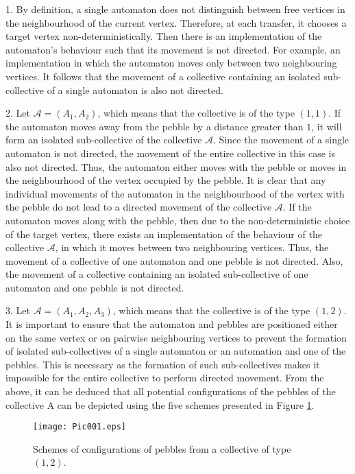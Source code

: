 \documentclass{article}
\newenvironment{proof}[1][Proof]{\begin{trivlist}
\item[\hskip \labelsep {\bfseries #1}]}{\end{trivlist}}
\begin{document}
\begin{proof}
1. By definition, a single automaton does not distinguish between free vertices in the neighbourhood of the current vertex. 
Therefore, at each transfer, it chooses a target vertex non-deterministically.
Then there is an implementation of the automaton's behaviour such that its movement is not directed.
For example, an implementation in which the automaton moves only between two neighbouring vertices.
It follows that the movement of a collective containing an isolated sub-collective of a single automaton is also not directed.

2. Let $\mathcal{A} = \left( A_{1}, A_{2} \right)$, which means that the collective is of the type $(1, 1)$.
If the automaton moves away from the pebble by a distance greater than $1$, it will form an isolated sub-collective of the collective $\mathcal{A}$.
Since the movement of a single automaton is not directed, the movement of the entire collective in this case is also not directed.
Thus, the automaton either moves with the pebble or moves in the neighbourhood of the vertex occupied by the pebble.
It is clear that any individual movements of the automaton in the neighbourhood of the vertex with the pebble do not lead to a directed movement of the collective $\mathcal{A}$.
If the automaton moves along with the pebble, then due to the non-deterministic choice of the target vertex, there exists an implementation of the behaviour of the collective $\mathcal{A}$, in which it moves between two neighbouring vertices.
Thus, the movement of a collective of one automaton and one pebble is not directed. 
Also, the movement of a collective containing an isolated sub-collective of one automaton and one pebble is not directed.

3. Let $\mathcal{A} = \left( A_{1}, A_{2}, A_{3} \right)$, which means that the collective is of the type $(1, 2)$.
It is important to ensure that the automaton and pebbles are positioned either on the same vertex or on pairwise neighbouring vertices to prevent the formation of isolated sub-collectives of a single automaton or an automation and one of the pebbles. 
This is necessary as the formation of such sub-collectives makes it impossible for the entire collective to perform directed movement.
From the above, it can be deduced that all potential configurations of the pebbles of the collective A can be depicted using the five schemes presented in Figure \ref{fig:fig1}.

\begin{figure}
	\centering
	\texttt{[image: Pic001.eps]}
	\caption{Schemes of configurations of pebbles from a collective of type $(1, 2)$.}
	\label{fig:fig1}
\end{figure}


\end{proof}
\end{document}
